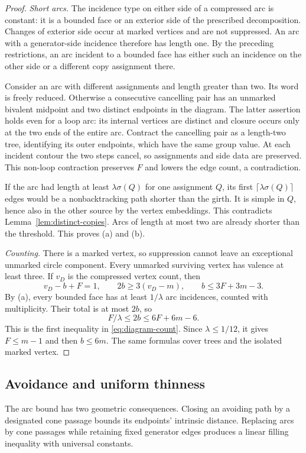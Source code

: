 \begin{proof}
\emph{Short arcs.}
The incidence type on either side of a compressed arc is constant: it is
a bounded face or an exterior side of the prescribed decomposition.
Changes of exterior side occur at marked vertices and are not suppressed.
An arc with a generator-side incidence therefore has length one. By the
preceding restrictions, an arc incident to a bounded face has either such
an incidence on the other side or a different copy assignment there.

Consider an arc with different assignments and length greater than two.
Its word is freely reduced. Otherwise a consecutive cancelling pair has
an unmarked bivalent midpoint and two distinct endpoints in the diagram.
The latter assertion holds even for a loop arc: its internal vertices are
distinct and closure occurs only at the two ends of the entire arc.
Contract the cancelling pair as a length-two tree, identifying its outer
endpoints, which have the same group value. At each incident contour the
two steps cancel, so assignments and side data are preserved. This
non-loop contraction preserves \(F\) and lowers the edge count, a
contradiction.

If the arc had length at least \(\lambda\sigma(Q)\) for one assignment
\(Q\), its first \(\lceil\lambda\sigma(Q)\rceil\) edges would be a
nonbacktracking path shorter than the girth. It is simple in \(Q\), hence
also in the other source by the vertex embeddings. This contradicts
Lemma~\ref{lem:distinct-copies}. Arcs of length at most two are already
shorter than the threshold. This proves (a) and (b).

\emph{Counting.}
There is a marked vertex, so suppression cannot leave an exceptional
unmarked circle component. Every unmarked surviving vertex has valence
at least three. If \(v_D\) is the compressed vertex count, then
\[
v_D-b+F=1,\qquad 2b\ge3(v_D-m),
\qquad b\le3F+3m-3.
\]
By (a), every bounded face has at least \(1/\lambda\) arc incidences,
counted with multiplicity. Their total is at most \(2b\), so
\[
F/\lambda\le2b\le6F+6m-6.
\]
This is the first inequality in \eqref{eq:diagram-count}. Since
\(\lambda\le1/12\), it gives \(F\le m-1\) and then \(b\le6m\).
The same formulas cover trees and the isolated marked vertex.
\end{proof}

\subsection{Avoidance and uniform thinness}

The arc bound has two geometric consequences. Closing an avoiding path
by a designated cone passage bounds its endpoints' intrinsic distance.
Replacing arcs by cone passages while retaining fixed generator edges
produces a linear filling inequality with universal constants.

